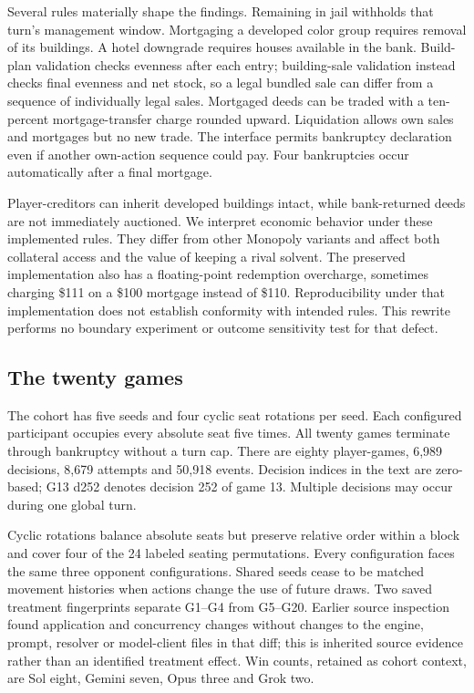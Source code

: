 \documentclass[11pt,letterpaper]{article}
\begin{document}
Several rules materially shape the findings. Remaining in jail withholds that turn's management window. Mortgaging a developed color group requires removal of its buildings. A hotel downgrade requires houses available in the bank. Build-plan validation checks evenness after each entry; building-sale validation instead checks final evenness and net stock, so a legal bundled sale can differ from a sequence of individually legal sales. Mortgaged deeds can be traded with a ten-percent mortgage-transfer charge rounded upward. Liquidation allows own sales and mortgages but no new trade. The interface permits bankruptcy declaration even if another own-action sequence could pay. Four bankruptcies occur automatically after a final mortgage.

Player-creditors can inherit developed buildings intact, while bank-returned deeds are not immediately auctioned. We interpret economic behavior under these implemented rules. They differ from other Monopoly variants and affect both collateral access and the value of keeping a rival solvent. The preserved implementation also has a floating-point redemption overcharge, sometimes charging \$111 on a \$100 mortgage instead of \$110. Reproducibility under that implementation does not establish conformity with intended rules. This rewrite performs no boundary experiment or outcome sensitivity test for that defect.

\subsection{The twenty games}

The cohort has five seeds and four cyclic seat rotations per seed. Each configured participant occupies every absolute seat five times. All twenty games terminate through bankruptcy without a turn cap. There are eighty player-games, 6,989 decisions, 8,679 attempts and 50,918 events. Decision indices in the text are zero-based; G13 d252 denotes decision 252 of game 13. Multiple decisions may occur during one global turn.

Cyclic rotations balance absolute seats but preserve relative order within a block and cover four of the 24 labeled seating permutations. Every configuration faces the same three opponent configurations. Shared seeds cease to be matched movement histories when actions change the use of future draws. Two saved treatment fingerprints separate G1--G4 from G5--G20. Earlier source inspection found application and concurrency changes without changes to the engine, prompt, resolver or model-client files in that diff; this is inherited source evidence rather than an identified treatment effect. Win counts, retained as cohort context, are Sol eight, Gemini seven, Opus three and Grok two.
\end{document}
